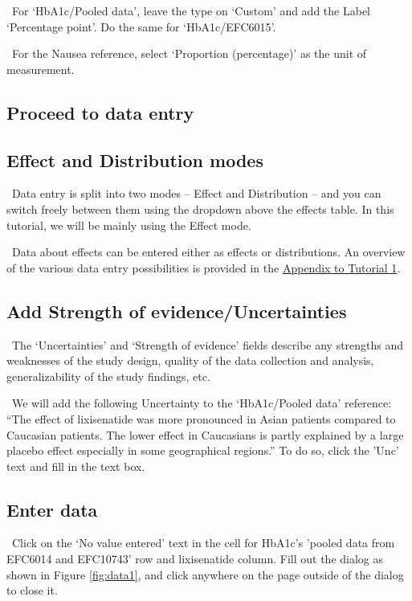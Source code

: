 \documentclass[00_mcda_tutorial.tex]{subfiles}
\begin{document}
\noindent \leftpointright \, For ‘HbA1c/Pooled data’, leave the type on ‘Custom’ and add the Label ‘Percentage point’. Do the same for ‘HbA1c/EFC6015’.
\newline

\noindent \leftpointright \, For the Nausea reference, select ‘Proportion (percentage)’ as the unit of measurement.
\newline

\subsection*{Proceed to data entry}

\subsection*{Effect and Distribution modes}
\noindent \faLightbulbO \, Data entry is split into two modes – Effect and Distribution – and you can switch freely between them using the dropdown above the effects table. In this tutorial, we will be mainly using the Effect mode.
\newline

\noindent \faGraduationCap \, Data about effects can be entered either as effects or distributions. An overview of the various data entry possibilities is provided in the \hyperref[appendix1]{Appendix to Tutorial 1}.

\subsection*{Add Strength of evidence/Uncertainties}
\noindent \faGraduationCap \, The ‘Uncertainties’ and ‘Strength of evidence’ fields describe any strengths and weaknesses of the study design, quality of the data collection and analysis, generalizability of the study findings, etc.
\newline

\noindent \leftpointright \, We will add the following Uncertainty to the ‘HbA1c/Pooled data’ reference: “The effect of lixisenatide was more pronounced in Asian patients compared to Caucasian patients. The lower effect in Caucasians is partly explained by a large placebo effect especially in some geographical regions.” To do so, click the 'Unc' text and fill in the text box.

\subsection*{Enter data}
\noindent \leftpointright \, Click on the ‘No value entered’ text in the cell for HbA1c's 'pooled data from EFC6014 and EFC10743' row and lixisenatide column. Fill out the dialog as shown in Figure \ref{fig:data1}, and click anywhere on the page outside of the dialog to close it.
\end{document}

